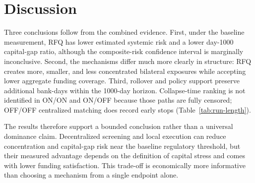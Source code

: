 \section{Discussion}

Three conclusions follow from the combined evidence. First, under the
baseline measurement, RFQ has lower estimated systemic risk and a lower
day-1000 capital-gap ratio, although the composite-risk confidence
interval is marginally inconclusive. Second, the mechanisms differ much
more clearly in structure: RFQ creates more, smaller, and less
concentrated bilateral exposures while accepting lower aggregate funding
coverage. Third, rollover and policy support preserve additional
bank-days within the 1000-day horizon. Collapse-time ranking is not
identified in ON/ON and ON/OFF because those paths are fully censored;
OFF/OFF centralized matching does record early stops
(Table~\ref{tab:run-length}).

The results therefore support a bounded conclusion rather than a universal
dominance claim. Decentralized screening and local execution can reduce
concentration and capital-gap risk near the baseline regulatory threshold,
but their measured advantage depends on the definition of capital stress
and comes with lower funding satisfaction. This trade-off is economically
more informative than choosing a mechanism from a single endpoint alone.
